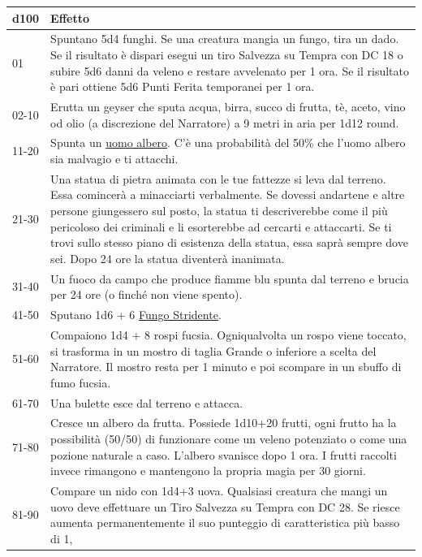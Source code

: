\begin{multicols}{2}
\noindent\begin{tabularx}{0.50\textwidth}{lX}
\textbf{d100} & \textbf{Effetto}\\
\hline
01 &Spuntano 5d4 funghi. Se una creatura mangia un fungo, tira un dado. Se il risultato è dispari esegui un tiro Salvezza su Tempra con DC 18 o subire 5d6 danni da veleno e restare avvelenato per 1 ora. Se il risultato è pari ottiene 5d6 Punti Ferita temporanei per 1 ora.\\
02-10 &Erutta un geyser che sputa acqua, birra, succo di frutta, tè, aceto, vino od olio (a discrezione del Narratore) a 9 metri in aria per 1d12 round.\\
11-20 &Spunta un \hyperlink{Uomo Albero (Arborom)}{uomo albero}. C'è una probabilità del 50\% che l'uomo albero sia malvagio e ti attacchi.\\
21-30 &Una statua di pietra animata con le tue fattezze si leva dal terreno. Essa comincerà a minacciarti verbalmente. Se dovessi andartene e altre persone giungessero sul posto, la statua ti descriverebbe come il più pericoloso dei criminali e li esorterebbe ad cercarti e attaccarti. Se ti trovi sullo stesso piano di esistenza della statua, essa saprà sempre dove sei. Dopo 24 ore la statua diventerà inanimata.\\
31-40 &Un fuoco da campo che produce fiamme blu spunta dal terreno e brucia per 24 ore (o finché non viene spento).\\
41-50 &Sputano 1d6 + 6 \hyperlink{Fungo Stridente}{Fungo Stridente}.\\
51-60 &Compaiono 1d4 + 8 rospi fucsia. Ogniqualvolta un rospo viene toccato, si trasforma in un mostro di taglia Grande o inferiore a scelta del Narratore. Il mostro resta per 1 minuto e poi scompare in un sbuffo di fumo fucsia. \\
61-70 & Una bulette esce dal terreno e attacca.\\
71-80 &Cresce un albero da frutta. Possiede 1d10+20 frutti, ogni frutto ha la possibilità (50/50) di funzionare come un veleno potenziato o come una pozione naturale a caso. L'albero svanisce dopo 1 ora. I frutti raccolti invece rimangono e mantengono la propria magia per 30 giorni. \\
81-90 &Compare un nido con 1d4+3 uova. Qualsiasi creatura che mangi un uovo deve effettuare un Tiro Salvezza su Tempra con DC 28. Se riesce aumenta permanentemente il suo punteggio di caratteristica più basso di 1,\\
\end{tabularx}
\noindent\begin{tabularx}{0.50\textwidth}{lX}

\end{tabularx}
\end{multicols}
